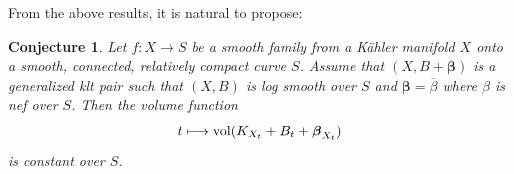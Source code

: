 \documentclass[12pt]{amsart}
\numberwithin{equation}{section}
\theoremstyle{definition}
\theoremstyle{plain}
\newtheorem{conjecture}  [theorem]     {Conjecture}
\newtheorem*{thm A*}{Theorem A}
\newtheorem*{thm B*}{Theorem B}
\newtheorem*{thm C*}{Theorem C}
\newtheorem*{thm D*}{Theorem D}
\theoremstyle{definition}
\renewcommand{\1}{\mathds{1}}
\newcommand{\bbeta}{\boldsymbol{\beta}}
\renewcommand{\>}{\rightarrow}
\begin{document}
From the above results, it is natural to propose:
\begin{conjecture}
Let $f:X\to S$ be a smooth family from a K\"ahler manifold $X$ onto a smooth, connected, relatively compact curve $S$. Assume that $(X,B+\bbeta)$ is a generalized klt pair such that $(X,B)$ is log smooth over $S$ and $\bbeta =\overline \beta $ where $\beta$ is nef over $S$. Then the volume function
\[t\longmapsto {\rm vol}(K_{X_t}+B_t+\bbeta _{X_t})\]
is constant over $S$.
\end{conjecture}






\end{document}

